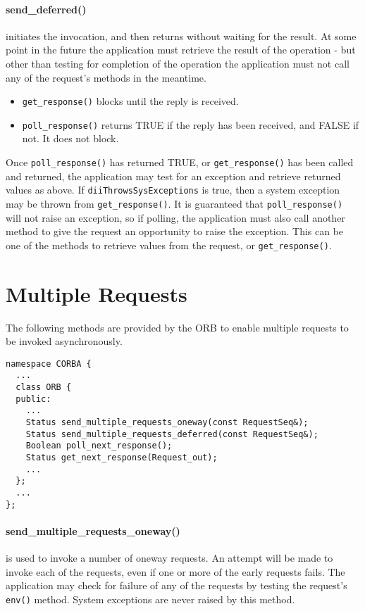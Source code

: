 \documentclass[11pt,twoside,onecolumn]{book}
\begin{document}
\paragraph{send\_deferred()} initiates the invocation, and then returns
without waiting for the result. At some point in the future the application
must retrieve the result of the operation - but other than testing for
completion of the operation the application must not call any of the
request's methods in the meantime.
\begin{itemize}
\item {\tt get\_response()} blocks until the reply is received.
\item {\tt poll\_response()} returns TRUE if the reply has been received,
      and FALSE if not. It does not block.
\end{itemize}
Once {\tt poll\_response()} has returned TRUE, or {\tt get\_response()}
has been called and returned, the application may test for an exception
and retrieve returned values as above. If {\tt diiThrowsSysExceptions} is
true, then a system exception may be thrown from {\tt get\_response()}.
It is guaranteed that {\tt poll\_response()} will not raise an
exception, so if polling, the application must also call another method
to give the request an opportunity to raise the exception. This can be
one of the methods to retrieve values from the request, or
{\tt get\_response()}.


\section{Multiple Requests}

The following methods are provided by the ORB to enable multiple requests to
be invoked asynchronously.

{\small \begin{verbatim}
namespace CORBA {
  ...
  class ORB {
  public:
    ...
    Status send_multiple_requests_oneway(const RequestSeq&);
    Status send_multiple_requests_deferred(const RequestSeq&);
    Boolean poll_next_response();
    Status get_next_response(Request_out);
    ...
  };
  ...
};
\end{verbatim}}

\paragraph{send\_multiple\_requests\_oneway()} is used to invoke a number
of oneway requests. An attempt will be
made to invoke each of the requests, even if one or more of the early
requests fails.
The application may check for failure of any of the requests by testing
the request's {\tt env()} method. System exceptions are never raised by
this method.
\end{document}
